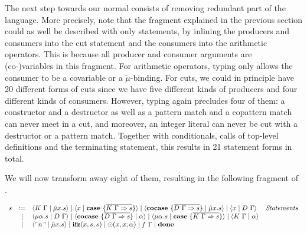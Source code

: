 The next step towards our normal consists of removing redundant part of the language.
More precisely, note that the fragment \targetvar{} explained in the previous section could as well be described with only statements, by inlining the producers and consumers into the cut statement and the consumers into the arithmetic operators.
This is because all producer and consumer arguments are (co-)variables in this fragment.
For arithmetic operators, typing only allows the consumer to be a covariable or a $\tilde\mu$-binding.
For cuts, we could in principle have 20 different forms of cuts since we have five different kinds of producers and four different kinds of consumers.
However, typing again precludes four of them: a constructor and a destructor as well as a pattern match and a copattern match can never meet in a cut, and moreover, an integer literal can never be cut with a destructor or a pattern match.
Together with conditionals, calls of top-level definitions and the terminating statement, this results in 21 statement forms in total.

We will now transform away eight of them, resulting in the following fragment \targetred{} of \targetlang{}.

\begin{definition}
  \[
    \begin{array}{rcll}
      s & \coloneqq & \langle K\ \Gamma \mid \tilde{\mu}x.s \rangle \mid \langle x \mid \mathbf{case}\ \{ \overline{K\ \Gamma \Rightarrow s} \} \rangle \mid \langle \mathbf{cocase}\ \{ \overline{D\ \Gamma \Rightarrow s} \} \mid \tilde{\mu}x.s \rangle \mid \langle x \mid D\ \Gamma \rangle & \emph{Statements}\\
       & \mid & \langle \mu\alpha.s \mid D\ \Gamma \rangle \mid \langle \mathbf{cocase}\ \{ \overline{D\ \Gamma \Rightarrow s} \} \mid \alpha \rangle \mid \langle \mu\alpha.s \mid \mathbf{case}\ \{ \overline{K\ \Gamma \Rightarrow s} \} \rangle \mid \langle K\ \Gamma \mid \alpha \rangle & \\
       & \mid & \langle \ulcorner n \urcorner \mid \tilde{\mu}x.s \rangle \mid \mathbf{ifz}(x, s, s) \mid \odot(x, x; \alpha) \mid f\ \Gamma \mid \mathbf{done} & \\
    \end{array}
  \]
\end{definition}

